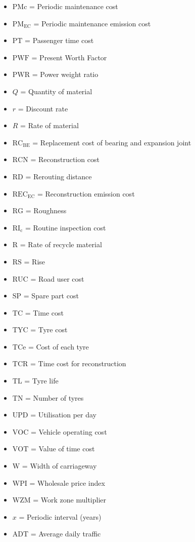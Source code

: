 \documentclass[12pt,a4paper]{article}
\begin{document}
\begin{itemize}
\item $\mathrm{PMc}$ = Periodic maintenance cost
\item $\mathrm{PM_{EC}}$ = Periodic maintenance emission cost
\item $\mathrm{PT}$ = Passenger time cost
\item $\mathrm{PWF}$ = Present Worth Factor
\item $\mathrm{PWR}$ = Power weight ratio
\item $Q$ = Quantity of material
\item $r$ = Discount rate
\item $R$ = Rate of material
\item $\mathrm{RC_{BE}}$ = Replacement cost of bearing and expansion joint
\item $\mathrm{RCN}$ = Reconstruction cost
\item $\mathrm{RD}$ = Rerouting distance
\item $\mathrm{REC_{EC}}$ = Reconstruction emission cost
\item $\mathrm{RG}$ = Roughness
\item $\mathrm{RI_{c}}$ = Routine inspection cost 
\item $\mathrm{R}$ = Rate of recycle material
\item $\mathrm{RS}$ = Rise
\item $\mathrm{RUC}$ = Road user cost
\item $\mathrm{SP}$ = Spare part cost
\item $\mathrm{TC}$ = Time cost
\item $\mathrm{TYC}$ = Tyre cost
\item $\mathrm{TCe}$ = Cost of each tyre
\item $\mathrm{TCR}$ = Time cost for reconstruction
\item $\mathrm{TL}$ = Tyre life
\item $\mathrm{TN}$ = Number of tyres
\item $\mathrm{UPD}$ = Utilisation per day
\item $\mathrm{VOC}$ = Vehicle operating cost
\item $\mathrm{VOT}$ = Value of time cost
\item $\mathrm{W}$ = Width of carriageway
\item $\mathrm{WPI}$ = Wholesale price index
\item $\mathrm{WZM}$ = Work zone multiplier
\item $x$ = Periodic interval (years)
\item $\mathrm{ADT}$ = Average daily traffic

\end{itemize}
\end{document}
